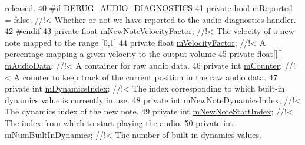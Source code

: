 \begin{DoxyCodeInclude}
{       released.}
40 \textcolor{comment}{}\textcolor{preprocessor}{    #if DEBUG\_AUDIO\_DIAGNOSTICS}
41         \textcolor{keyword}{private} \textcolor{keywordtype}{bool} mReported = \textcolor{keyword}{false}; \textcolor{comment}{//!< Whether or not we have reported to the audio diagnostics
       handler.}
42 \textcolor{comment}{}\textcolor{preprocessor}{    #endif}
43     \textcolor{keyword}{private} \textcolor{keywordtype}{float}                      \hyperlink{group___n_o_o_priv_var_gaf3cd650d21c56c25ce988d9f75279278}{mNewNoteVelocityFactor}; \textcolor{comment}{//!< The velocity of a
       new note mapped to the range [0,1]}
44 \textcolor{comment}{}    \textcolor{keyword}{private} \textcolor{keywordtype}{float}                      \hyperlink{group___n_o_o_priv_var_ga84df25e871d69746a7c520f3f8b49a27}{mVelocityFactor}; \textcolor{comment}{//!< A percentage mapping a given
       velocity to the output volume}
45 \textcolor{comment}{}    \textcolor{keyword}{private} \textcolor{keywordtype}{float}[][]                  \hyperlink{group___n_o_o_priv_var_ga842eef5bfade070f914b8a551b3bcf43}{mAudioData}; \textcolor{comment}{//!< A container for raw audio data.}
46 \textcolor{comment}{}    \textcolor{keyword}{private} \textcolor{keywordtype}{int}                        \hyperlink{group___n_o_o_priv_var_ga5dca97be8d58837ace4ea6f4a972b20a}{mCounter}; \textcolor{comment}{//!< A counter to keep track of the current
       position in the raw audio data.}
47 \textcolor{comment}{}    \textcolor{keyword}{private} \textcolor{keywordtype}{int}                        \hyperlink{group___n_o_o_priv_var_gaf0c9c2a90b5d73b8ffa0906bc69acdbc}{mDynamicsIndex}; \textcolor{comment}{//!< The index corresponding to which
       built-in dynamics value is currently in use.}
48 \textcolor{comment}{}    \textcolor{keyword}{private} \textcolor{keywordtype}{int}                        \hyperlink{group___n_o_o_priv_var_ga13de232048b35fc513f8aa3eeef65de0}{mNewNoteDynamicsIndex}; \textcolor{comment}{//!< The dynamics index
       of the new note.}
49 \textcolor{comment}{}    \textcolor{keyword}{private} \textcolor{keywordtype}{int}                        \hyperlink{group___n_o_o_priv_var_ga93720712088a4b6f91abe63d6f07a2c2}{mNewNoteStartIndex}; \textcolor{comment}{//!< The index from which to
       start playing the audio.}
50 \textcolor{comment}{}    \textcolor{keyword}{private} \textcolor{keywordtype}{int}                        \hyperlink{group___n_o_o_priv_var_ga3cc04564fcc1b1c4597af18e7e4fbc47}{mNumBuiltInDynamics}; \textcolor{comment}{//!< The number of built-in
       dynamics values.}

\end{DoxyCodeInclude}
